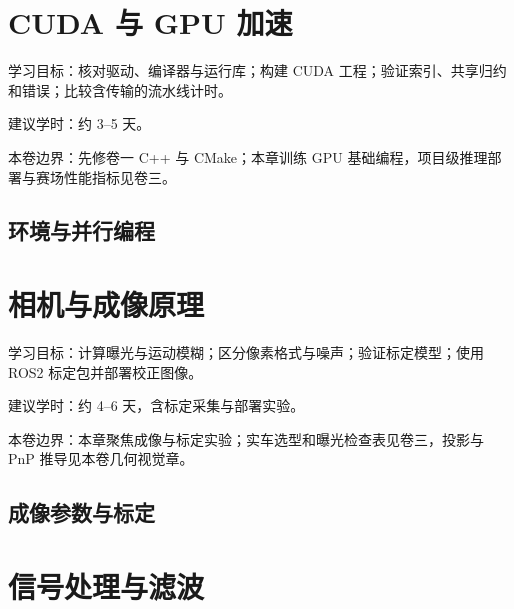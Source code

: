 \documentclass[
  lang=cn,
  scheme=chinese,
  chinesefont=ctexfont,
  11pt,
  oneside,
  device=normal,
  color=cyan,
  mode=fancy
]{elegantbook}
\begin{document}




\chapter{CUDA 与 GPU 加速}

\begin{introduction}
  \item 学习目标：核对驱动、编译器与运行库；构建 CUDA 工程；验证索引、共享归约和错误；比较含传输的流水线计时。
  \item 建议学时：约 3--5 天。
  \item 本卷边界：先修卷一 C++ 与 CMake；本章训练 GPU 基础编程，项目级推理部署与赛场性能指标见卷三。
\end{introduction}

\section{环境与并行编程}





\chapter{相机与成像原理}

\begin{introduction}
  \item 学习目标：计算曝光与运动模糊；区分像素格式与噪声；验证标定模型；使用 ROS2 标定包并部署校正图像。
  \item 建议学时：约 4--6 天，含标定采集与部署实验。
  \item 本卷边界：本章聚焦成像与标定实验；实车选型和曝光检查表见卷三，投影与 PnP 推导见本卷几何视觉章。
\end{introduction}

\section{成像参数与标定}





\chapter{信号处理与滤波}
\end{document}
